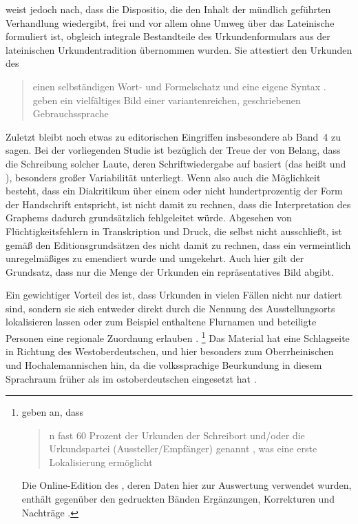 \citet[13, 25--38]{schulze2011} weist jedoch nach, dass die Dispositio, die den
Inhalt der mündlich geführten Verhandlung wiedergibt, frei und
vor allem ohne Umweg über das Lateinische
formuliert ist, obgleich integrale Bestandteile des
Urkundenformulars aus der lateinischen
Urkundentradition übernommen wurden. Sie attestiert den Urkunden des \CAO{}
\blockcquote[3]{schulze1994}{einen selbständigen Wort- und Formelschatz und
eine eigene Syntax \textelp{}.  geben ein vielfältiges
Bild einer variantenreichen, geschriebenen
Gebrauchs\-sprache}.

Zuletzt bleibt noch etwas zu editorischen Eingriffen
insbesondere ab Band~4\nocite{cao4} zu sagen. Bei der vorliegenden Studie ist
bezüglich der Treue der  von Belang, dass die Schreibung
solcher Laute, deren Schriftwiedergabe auf  basiert (das heißt  und ), besonders großer Variabilität unterliegt.
Wenn also auch die Möglichkeit besteht, dass ein Diakritikum über einem 
oder  nicht hundertprozentig der Form der Handschrift entspricht, ist
nicht damit zu rechnen, dass die Interpretation des Graphems dadurch
grundsätzlich fehlgeleitet würde. Abgesehen von %
Flüchtigkeitsfehlern in Transkription und Druck, die selbst \citet[\RN{60},
\RN{78}]{wilhelm1932} nicht ausschließt, ist gemäß den
Editionsgrundsätzen des \CAO{} nicht damit zu rechnen,
dass ein vermeintlich unregelmäßiges  zu  emendiert wurde und
umgekehrt. Auch hier gilt der Grundsatz, dass nur die Menge der Urkunden ein
repräsentatives Bild abgibt.

Ein gewichtiger Vorteil des \CAO{} ist, dass Urkunden in vielen
Fällen nicht nur datiert sind, sondern sie sich entweder direkt durch die
Nennung des Ausstellungsorts lokalisieren lassen oder zum Beispiel enthaltene
Flurnamen und beteiligte Personen eine regionale Zuordnung erlauben
\autocite[16]{schulze2011}.%
%
	\footnote{\citet[393]{gniffkerapp2005} geben an, dass
	\blockquote{n fast 60 Prozent der Urkunden
	\textelp{} der Schreibort und/oder die Urkundspartei (Aussteller/Empfänger)
	genannt , was eine erste Lokalisierung ermöglicht}. Die
	Online-Edition des \CAO{} \autocite{cao-online}, deren Daten hier zur
	Auswertung verwendet wurden, enthält gegenüber den gedruckten Bänden
	Ergänzungen, Korrekturen und Nachträge
	\autocite[vgl.][393--394]{gniffkerapp2005}.}
%
Das Material hat eine Schlagseite in Richtung des
Westoberdeutschen, und hier besonders zum
Oberrheinischen und Hochalemannischen hin, da
die volkssprachige Beurkundung in diesem
Sprachraum früher als im ostoberdeutschen
eingesetzt hat \autocites[1774]{skala1985}[15]{schulze2011}.

